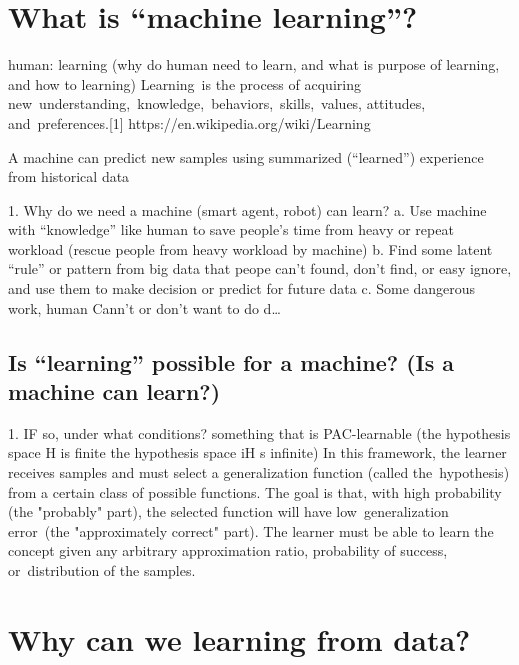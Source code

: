 


\section{What is “machine learning”?}

human: learning (why do human need to learn, and what is purpose of learning, and how to learning)
Learning is the process of acquiring new understanding, knowledge, behaviors, skills, values, attitudes, and preferences.[1]
https://en.wikipedia.org/wiki/Learning

A machine can predict new samples using summarized (“learned”) experience from historical data

1. Why do we need a machine (smart agent, robot) can learn?
a. Use machine with “knowledge” like human to save people’s time from heavy or repeat workload (rescue people from heavy workload by machine)
b. Find some latent “rule” or pattern from big data that peope can’t found, don’t find, or easy ignore, and use them to make decision or predict for future data
c. Some dangerous work, human Cann’t or don’t want to do
d…

\subsection{Is “learning” possible for a machine? (Is a machine can learn?)}
1. IF so, under what conditions?
something that is PAC-learnable
(the hypothesis space H is finite
the hypothesis space iH s infinite)
In this framework, the learner receives samples and must select a generalization function (called the hypothesis) from a certain class of possible functions. The goal is that, with high probability (the "probably" part), the selected function will have low generalization error (the "approximately correct" part). The learner must be able to learn the concept given any arbitrary approximation ratio, probability of success, or distribution of the samples.

\section{Why can we learning from data?}

